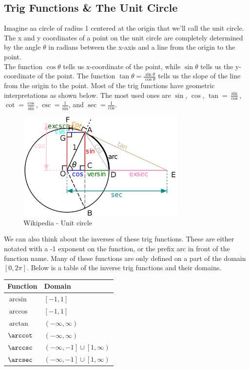 \subsection{Trig Functions \& The Unit Circle}
\noindent
Imagine aa circle of radius 1 centered at the origin that we'll call the unit circle. The x and y coordinates of a point on the unit circle are completely determined by the angle $\theta$ in radians between the x-axis and a line from the origin to the point.\\

\noindent
The function $\cos{\theta}$ tells us x-coordinate of the point, while $\sin{\theta}$ tells us the y-coordinate of the point. The function $\tan{\theta} = \frac{\sin{\theta}}{\cos{\theta}}$ tells us the slope of the line from the origin to the point. Most of the trig functions have geometric interpretations as shown below. The most used ones are $\sin$, $\cos$, $\tan=\frac{\sin}{\cos}$, $\cot = \frac{\cos}{\sin}$, $\csc=\frac{1}{\sin}$, and $\sec=\frac{1}{\cos}$.

\begin{figure}[H]
	\label{unitCircle}
	\centering
	\includegraphics[width = 0.75\textwidth]{./backgroundReview/unitCircle2}
	\caption{Wikipedia - Unit circle}
\end{figure}

\noindent
We can also think about the inverses of these trig functions. These are either notated with a -1 exponent on the function, or the prefix arc in front of the function name. Many of these functions are only defined on a part of the domain $\left[0, 2\pi\right]$. Below is a table of the inverse trig functions and their domains.

\begin{table}[H]
	\centering
	\begin{tabular}{l|l}
		Function  & Domain                                                 \\ \hline
		$\arcsin$ & $\left[-1, 1\right]$           						   \\
		$\arccos$ & $\left[-1, 1\right]$                                   \\
		$\arctan$ & $\left(-\infty, \infty\right)$                         \\
		$\arccot$ & $\left(-\infty, \infty\right)$                         \\
		$\arccsc$ & $\left(-\infty, -1\right] \cup \left[1, \infty\right)$ \\
		$\arcsec$ & $\left(-\infty, -1\right] \cup \left[1, \infty\right)$
	\end{tabular}
\end{table}
